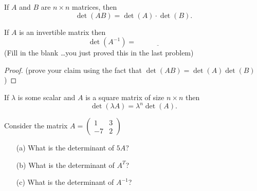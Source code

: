 \begin{thm}
    If $A$ and $B$ are $n \times n$ matrices, then
    \[ \det(AB) = \det(A) \cdot \det(B). \]
\end{thm}

% 

% 
% 
%             

\begin{thm}
    If $A$ is an invertible matrix then \[ \det(A^{-1}) = \underline{\hspace{1in}} \] (Fill
    in the blank \ldots you just proved this in the last problem)
\end{thm}
\begin{proof}
    (prove your claim using the fact that $\det(AB) = \det(A)\det(B)$)
\end{proof}

\begin{thm}
    If $\lambda$ is some scalar and $A$ is a square matrix of size $n \times n$ then
    \[ \det(\lambda A) = \lambda^n \det(A). \]
\end{thm}


\begin{problem}
    Consider the matrix $A = \begin{pmatrix} 1 & 3 \\ -7 & 2 \end{pmatrix}$
    \begin{enumerate}
        \item[(a)] What is the determinant of $5A$?
        \item[(b)] What is the determinant of $A^T$?
        \item[(c)] What is the determinant of $A^{-1}$?
    \end{enumerate}
\end{problem}

